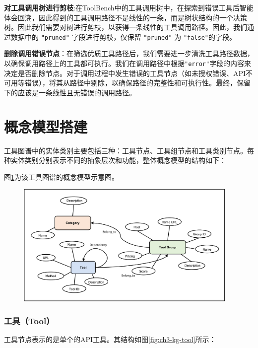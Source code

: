\textbf{对工具调用树进行剪枝}:在ToolBench中的工具调用树中，在探索到错误工具后智能体会回溯，因此得到的工具调用路径不是线性的一条，而是树状结构的一个决策树。因此我们需要对树进行剪枝，以获得一条线性的工具调用路径。因此，我们通过数据中的 \texttt{"pruned"} 字段进行剪枝，仅保留 \texttt{"pruned"} 为 \texttt{"false"}的字段。

\textbf{删除调用错误节点}：在筛选优质工具路径后，我们需要进一步清洗工具路径数据，以确保调用路径上的工具都可执行。我们在调用路径中根据\texttt{"error"}字段的内容来决定是否删除节点。对于调用过程中发生错误的工具节点（如未授权错误、API不可用等错误），将其从路径中剔除，以确保路径的完整性和可执行性。最终，保留下的应该是一条线性且无错误的调用路径。


\section{概念模型搭建}

工具图谱中的实体类别主要包括三种：工具节点、工具组节点和工具类别节点。每种实体类别分别表示不同的抽象层次和功能，整体概念模型的结构如下：

图\ref{fig:ch3-knowledge-graph-ontology-model}为该工具图谱的概念模型示意图。

\begin{figure}[H]
    \vspace{1em}
    \centering
    \setlength{\abovecaptionskip}{10pt} %
    \includegraphics[height=6cm]{../assets/图谱概念模型.png}
    \label{fig:ch3-knowledge-graph-ontology-model}
\end{figure}

\subsubsection{工具（Tool）}

工具节点表示的是单个的API工具。其结构如图\ref{fig:ch3-kg-tool}所示：

